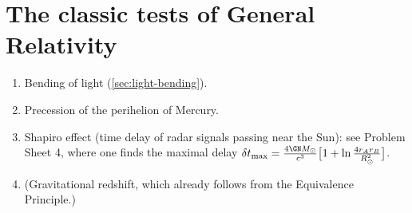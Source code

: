 \section{The classic tests of General Relativity}
\begin{enumerate}[label=(\roman*),nosep]
\item Bending of light (\cref{sec:light-bending}).
\item Precession of the perihelion of Mercury.
\item Shapiro effect (time delay of radar signals passing near the Sun): see Problem Sheet 4, where one finds the maximal delay $\delta t_{\max}=\frac{4\GN M_\odot}{c^3}\big[1+\ln\frac{4r_Ar_B}{R_\odot^2}\big]$.
\item (Gravitational redshift, which already follows from the Equivalence Principle.)
\end{enumerate}
